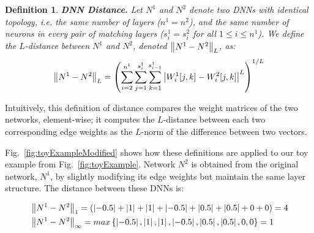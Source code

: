 \documentclass{easychair}
\newtheorem{definition}{Definition}
\begin{document}
\begin{definition}\textbf{DNN Distance.}
  Let $N^1$ and $N^2$ denote two DNNs with identical topology,
  i.e. the same number of layers ($n^1=n^2$), and the same number of
  neurons in every pair of matching layers ($s_i^1=s_i^2$ for all
  $1\leq i \leq n^1$). We define the $L$-distance between $N^1$ and $N^2$,
  denoted $\left\lVert N^1-N^2\right\rVert_L$, as:
  \[
    \left\lVert N^1-N^2\right\rVert_L =    \left(\sum_{i=2}^{n^1}\sum_{j=1}^{s_{i}^1}\sum_{k=1}^{s_{i-1}^1}
    \left\lvert W^1_i[j,k] - W^2_i[j,k]\right\rvert^L\right)^{1/L}
  \]
\end{definition}

Intuitively, this definition of distance compares the weight matrices
of the two networks, element-wise; it computes the $L$-distance
between each two corresponding edge weights as the $L$-norm of the difference between two vectors.

Fig.~\ref{fig:toyExampleModified} shows how these definitions are applied
to our toy example from Fig.~\ref{fig:toyExample}. Network $N^2$ is
obtained from the original network, $N^1$, by slightly modifying its
edge weights but maintain the same layer structure. The distance
between these DNNs is:

\begin{align*}
	&\left\lVert N^1-N^2\right\rVert_1=(\left\lvert-0.5\right\rvert+\left\lvert1\right\rvert+\left\lvert1\right\rvert+\left\lvert-0.5\right\rvert+\left\lvert0.5\right\rvert+\left\lvert0.5\right\rvert+0+0)=4\\
	&\left\lVert N^1-N^2\right\rVert_\infty=max\left\lbrace \left\lvert-0.5\right\rvert,\left\lvert1\right\rvert,\left\lvert1\right\rvert,\left\lvert-0.5\right\rvert,\left\lvert0.5\right\rvert,\left\lvert0.5\right\rvert,0,0\right\rbrace=1
\end{align*}
\end{document}
